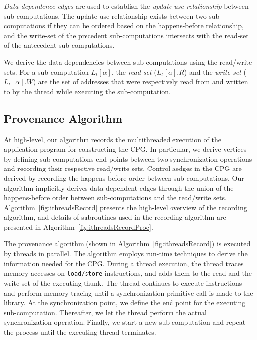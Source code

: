   {\em Data dependence edges} are used to establish the {\em update-use relationship} between sub-computations. The update-use relationship exists between two sub-computations if they can be  ordered based on the happens-before relationship, and the write-set of the  precedent  sub-computations intersects with the read-set of the antecedent sub-computations. 

We derive the data dependencies between sub-computations using the read/write sets. For a sub-computation $L_t[\alpha]$, the {\em read-set}
($L_t[\alpha].R$) and the {\em write-set} ($L_t[\alpha].W$) are the set of
addresses that were respectively read from and written to by
the thread while executing the sub-computation.






 
 
 \subsection{ Provenance Algorithm}

 
 
At high-level, our algorithm records the multithreaded execution of the
application program for constructing the CPG.
In particular, we derive vertices  by defining
sub-computations end points between two synchronization operations and recording their respective read/write sets. Control aedges in the CPG are derived by recording the happens-before order between sub-computations. Our algorithm implicitly derives data-dependent edges through the union of the happens-before order between sub-computations and the read/write sets. Algorithm~\ref{fig:ithreadsRecord} presents the high-level
overview of the recording algorithm, and details of subroutines used in the recording algorithm are presented in Algorithm~\ref{fig:ithreadsRecordProc}.
  

   The provenance algorithm (shown in Algorithm~\ref{fig:ithreadsRecord}) is executed by threads in parallel. The algorithm employs run-time techniques to derive the information needed for the CPG. During a thread execution, the thread traces memory accesses on {\tt load/store} instructions, and adds them to the read and
the write set of the executing thunk. The thread continues to execute instructions and perform memory tracing until a synchronization primitive call is made to the \pthreads  library. At the synchronization point, we define the end point for the executing sub-computation. 
Thereafter, we let the thread perform the actual synchronization operation.
Finally, we start a new sub-computation and repeat the process until the executing thread
terminates. 

